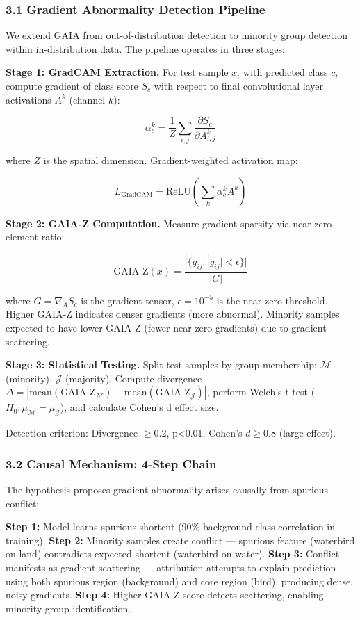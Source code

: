 
\subsubsection{3.1 Gradient Abnormality Detection Pipeline}

We extend GAIA from out-of-distribution detection to minority group detection within in-distribution data. The pipeline operates in three stages:

\textbf{Stage 1: GradCAM Extraction.} For test sample $x_i$ with predicted class $c$, compute gradient of class score $S_c$ with respect to final convolutional layer activations $A^k$ (channel $k$):

$$\alpha_c^k = \frac{1}{Z} \sum_{i,j} \frac{\partial S_c}{\partial A_{i,j}^k}$$

where $Z$ is the spatial dimension. Gradient-weighted activation map:

$$L_{\text{GradCAM}} = \text{ReLU}\left(\sum_k \alpha_c^k A^k\right)$$

\textbf{Stage 2: GAIA-Z Computation.} Measure gradient sparsity via near-zero element ratio:

$$\text{GAIA-Z}(x) = \frac{|\{g_{ij} : |g_{ij}| < \epsilon\}|}{|G|}$$

where $G = \nabla_A S_c$ is the gradient tensor, $\epsilon = 10^{-5}$ is the near-zero threshold. Higher GAIA-Z indicates denser gradients (more abnormal). Minority samples expected to have lower GAIA-Z (fewer near-zero gradients) due to gradient scattering.

\textbf{Stage 3: Statistical Testing.} Split test samples by group membership: $\mathcal{M}$ (minority), $\mathcal{J}$ (majority). Compute divergence $\Delta = |\text{mean}(\text{GAIA-Z}_\mathcal{M}) - \text{mean}(\text{GAIA-Z}_\mathcal{J})|$, perform Welch's t-test ($H_0: \mu_\mathcal{M} = \mu_\mathcal{J}$), and calculate Cohen's d effect size.

Detection criterion: Divergence $\geq 0.2$, p<0.01, Cohen's $d\geq 0.8$ (large effect).

\subsubsection{3.2 Causal Mechanism: 4-Step Chain}

The hypothesis proposes gradient abnormality arises causally from spurious conflict:

\textbf{Step 1:} Model learns spurious shortcut (90\% background-class correlation in training).  
\textbf{Step 2:} Minority samples create conflict --- spurious feature (waterbird on land) contradicts expected shortcut (waterbird on water).  
\textbf{Step 3:} Conflict manifests as gradient scattering --- attribution attempts to explain prediction using both spurious region (background) and core region (bird), producing dense, noisy gradients.  
\textbf{Step 4:} Higher GAIA-Z score detects scattering, enabling minority group identification.

